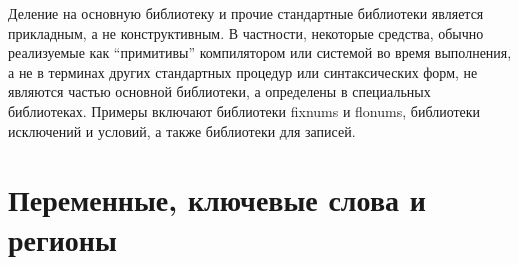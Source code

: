 Деление на основную библиотеку и прочие стандартные библиотеки является прикладным, а не
конструктивным. В частности, некоторые средства, обычно реализуемые как ``примитивы''
компилятором или системой во время выполнения, а не в терминах других стандартных процедур или
синтаксических форм, не являются частью основной библиотеки, а определены в специальных
библиотеках. Примеры включают библиотеки fixnums и flonums, библиотеки исключений и условий, а
также библиотеки для записей.\vspace{-1mm}

\section{Переменные, ключевые слова и регионы}\vspace{-1mm}
\label{specialformsection}
\label{variablesection}

